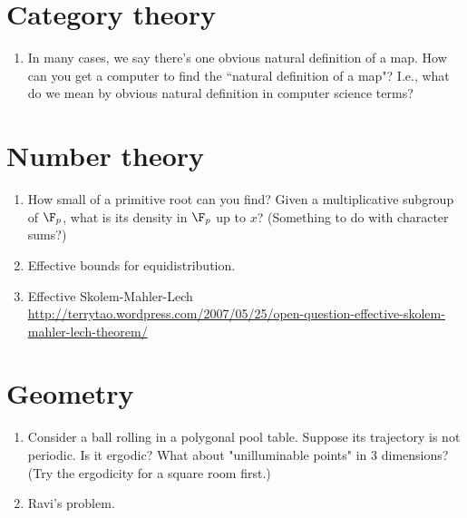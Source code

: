 \section{Category theory}
\begin{enumerate}
\item
In many cases, we say there's one obvious natural definition of a map. 
How can you get a computer to find the ``natural definition of a map"? I.e., what do we mean by obvious natural definition in computer science terms?
\end{enumerate}

\section{Number theory}
\begin{enumerate}
\item
How small of a primitive root can you find? Given a multiplicative subgroup of $\F_p$, what is its density in $\F_p$ up to $x$? (Something to do with character sums?)
\item Effective bounds for equidistribution.
\item Effective Skolem-Mahler-Lech \url{http://terrytao.wordpress.com/2007/05/25/open-question-effective-skolem-mahler-lech-theorem/}
\end{enumerate}
\section{Geometry}
\begin{enumerate}
\item
Consider a ball rolling in a polygonal pool table. Suppose its trajectory is not periodic. Is it ergodic? What about "unilluminable points" in 3 dimensions? (Try the ergodicity for a square room first.)
\item
Ravi's problem.
\end{enumerate}

%
 
%
%
